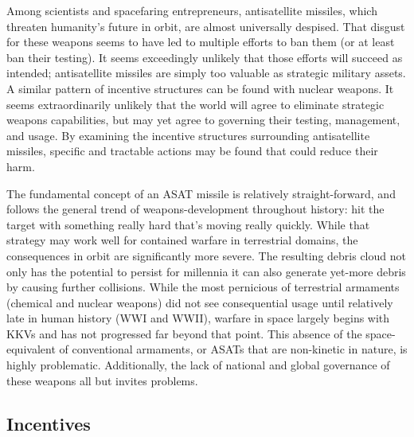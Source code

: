 
\maketitle

\pagestyle{theRest}
\thispagestyle{firstPage}



Among scientists and spacefaring entrepreneurs, antisatellite
missiles, which threaten humanity's future in orbit, are almost
universally despised.  That disgust for these weapons seems to have
led to multiple efforts to ban them (or at least ban their testing).
It seems exceedingly unlikely that those efforts will succeed as
intended; antisatellite missiles are simply too valuable as strategic
military assets.  A similar pattern of incentive structures can be
found with nuclear weapons.  It seems extraordinarily unlikely that
the world will agree to eliminate strategic weapons capabilities, but
may yet agree to governing their testing, management, and usage.  By
examining the incentive structures surrounding antisatellite missiles,
specific and tractable actions may be found that could reduce their
harm.

The fundamental concept of an ASAT missile is relatively
straight-forward, and follows the general trend of weapons-development
throughout history: hit the target with something really hard that's
moving really quickly.  While that strategy may work well for
contained warfare in terrestrial domains, the consequences in orbit
are significantly more severe.  The resulting debris cloud not only
has the potential to persist for millennia it can also generate
yet-more debris by causing further collisions.  While the most
pernicious of terrestrial armaments (chemical and nuclear weapons) did
not see consequential usage until relatively late in human history
(WWI and WWII), warfare in space largely begins with KKVs and has not
progressed far beyond that point.  This absence of the
space-equivalent of conventional armaments, or ASATs that are
non-kinetic in nature, is highly problematic.  Additionally, the lack
of national and global governance of these weapons all but invites
problems.

\subsection*{Incentives}

